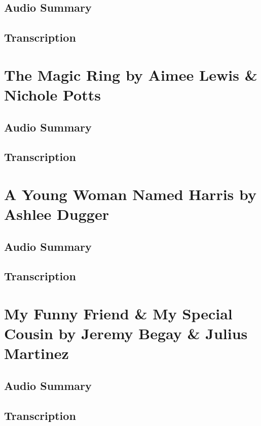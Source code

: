 \subsection{Audio Summary}

\subsection{Transcription}

\section{The Magic Ring by Aimee Lewis \& Nichole Potts}

\subsection{Audio Summary}

\subsection{Transcription}

\section{A Young Woman Named Harris by Ashlee Dugger}

\subsection{Audio Summary}

\subsection{Transcription}

\section{My Funny Friend \& My Special Cousin by Jeremy Begay \& Julius Martinez}

\subsection{Audio Summary}

\subsection{Transcription}

